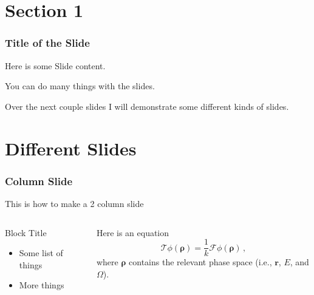 \documentclass[fleqn]{beamer}
\begin{document}

    \section{Section 1}
    
    \begin{frame}
        \frametitle{Title of the Slide}
        Here is some Slide content.
        
        You can do many things with the slides.
        
        Over the next couple slides I will demonstrate some different kinds of slides.
    \end{frame}
    
    \section{Different Slides} %
    \begin{frame}
        \frametitle{Column Slide}
        This is how to make a 2 column slide
        \begin{columns}[c]
            \begin{column}{0.5\textwidth} %
                \begin{block}{Block Title}
                    \begin{itemize}
                        \item Some list of things
                        \item More things
                    \end{itemize}
                \end{block}
            \end{column}
            
            \begin{column}{0.5\textwidth} %
                Here is an equation
                \begin{equation}
                    \mathcal{T} \phi(\bm{\rho}) = \frac{1}{k} \mathcal{F} \phi(\bm{\rho}) \, , \nonumber
                \end{equation}
                where $\bm{\rho}$ contains the relevant phase space (i.e., $\mathbf{r}$, $E$, and $\Omega$).
            \end{column}
        \end{columns}
    \end{frame}
    
\end{document}
